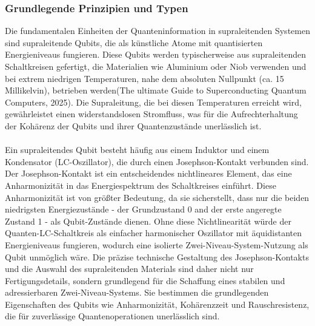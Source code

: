\subsubsection{Grundlegende Prinzipien und Typen}
Die fundamentalen Einheiten der Quanteninformation in supraleitenden Systemen sind supraleitende Qubits, die als künstliche Atome mit quantisierten Energieniveaus fungieren. Diese Qubits werden typischerweise aus supraleitenden Schaltkreisen gefertigt, die Materialien wie Aluminium oder Niob verwenden und bei extrem niedrigen Temperaturen, nahe dem absoluten Nullpunkt (ca. 15 Millikelvin), betrieben werden(The ultimate Guide to Superconducting Quantum Computers, 2025). Die Supraleitung, die bei diesen Temperaturen erreicht wird, gewährleistet einen widerstandslosen Stromfluss, was für die Aufrechterhaltung der Kohärenz der Qubits und ihrer Quantenzustände unerlässlich ist.
\\\\
Ein supraleitendes Qubit besteht häufig aus einem Induktor und einem Kondensator (LC-Oszillator), die durch einen Josephson-Kontakt verbunden sind. Der Josephson-Kontakt ist ein entscheidendes nichtlineares Element, das eine Anharmonizität in das Energiespektrum des Schaltkreises einführt. Diese Anharmonizität ist von größter Bedeutung, da sie sicherstellt, dass nur die beiden niedrigsten Energiezustände - der Grundzustand 0 and der erste angeregte Zustand 1 - als Qubit-Zustände dienen. Ohne diese Nichtlinearität würde der Quanten-LC-Schaltkreis als einfacher harmonischer Oszillator mit äquidistanten Energieniveaus fungieren, wodurch eine isolierte Zwei-Niveau-System-Nutzung als Qubit unmöglich wäre. Die präzise technische Gestaltung des Josephson-Kontakts und die Auswahl des supraleitenden Materials sind daher nicht nur Fertigungsdetails, sondern grundlegend für die Schaffung eines stabilen und adressierbaren Zwei-Niveau-Systems. Sie bestimmen die grundlegenden Eigenschaften des Qubits wie Anharmonizität, Kohärenzzeit und Rauschresistenz, die für zuverlässige Quantenoperationen unerlässlich sind.
\\\\
